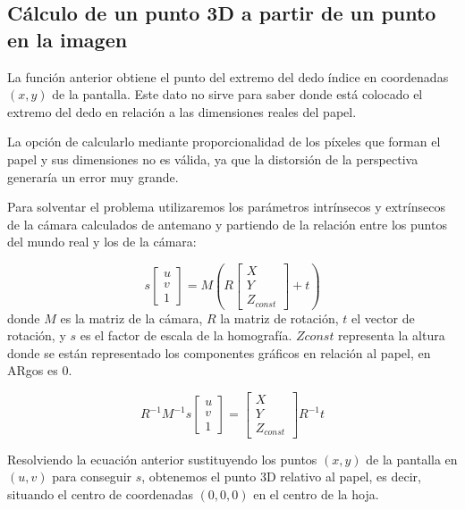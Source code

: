 \subsection{Cálculo de un punto 3D a partir de un punto en la imagen}
La función anterior obtiene el punto del extremo del dedo índice en
coordenadas $(x,y)$ de la pantalla. Este dato no sirve para saber
donde está colocado el extremo del dedo en relación a las
dimensiones reales del papel.

La opción de calcularlo mediante proporcionalidad de los píxeles que
forman el papel y sus dimensiones no es válida, ya que la distorsión
de la perspectiva generaría un error muy grande.

Para solventar el problema utilizaremos los parámetros intrínsecos y
extrínsecos de la cámara calculados de antemano y partiendo de la
relación entre los puntos del mundo real y los de la cámara:

\begin{equation}
s \begin{bmatrix}
u\\
v\\
1
\end{bmatrix} = M(R\begin{bmatrix}
X\\
Y\\
Z_{const}
\end{bmatrix}+t)
\end{equation}
donde $M$ es la matriz de la cámara, $R$ la matriz de rotación, $t$ el
vector de rotación, y $s$ es el factor de escala de la homografía. $Zconst$ representa la altura
donde se están representado los componentes gráficos en relación al
papel, en ARgos es 0.

\begin{equation}
R^{-1} M^{-1} s \begin{bmatrix}
u\\
v\\
1
\end{bmatrix} = \begin{bmatrix}
X\\
Y\\
Z_{const}
\end{bmatrix} R^{-1}t
\end{equation}

Resolviendo la ecuación anterior sustituyendo los puntos $(x,y)$ de la
pantalla en $(u,v)$ para conseguir $s$, obtenemos el punto 3D relativo
al papel, es decir, situando el centro de coordenadas $(0,0,0)$ en el
centro de la hoja.



